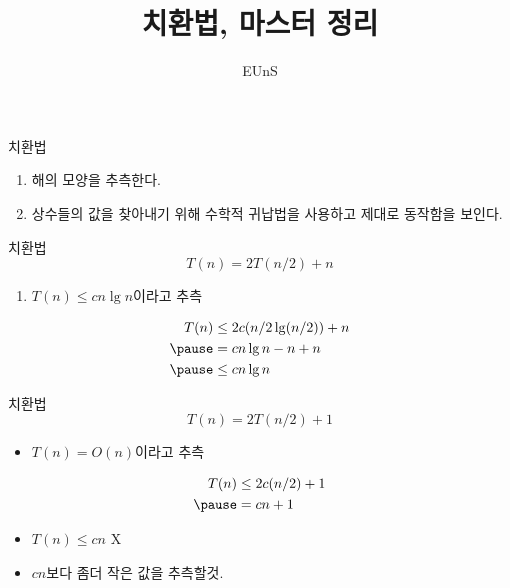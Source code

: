 \documentclass[10pt]{beamer}
\title{치환법, 마스터 정리}
\author{EUnS}
\begin{document}
\begin{frame}{}
    \maketitle
\end{frame}


\begin{frame}{치환법}
    \begin{enumerate}
        \item 해의 모양을 추측한다.
        \item 상수들의 값을 찾아내기 위해 수학적 귀납법을 사용하고 제대로 동작함을 보인다.
    \end{enumerate}
\end{frame}

\begin{frame}{치환법}
    $$T(n) = 2T(n/2) + n$$
    \begin{enumerate}
        \item $T(n) \le cn \lg n$이라고 추측
    \end{enumerate}
    \[
        \begin{aligned}
           T(n) &\le 2c(n/2\lg (n/2)) +n \\ \pause
            &= cn\lg n - n + n \\  \pause
            &\le cn\lg n
        \end{aligned}
    \]
\end{frame}


\begin{frame}{치환법}
    $$T(n) = 2T(n/2) + 1$$
    \begin{itemize}
        \item $T(n) = O(n)$이라고 추측
    \end{itemize}
    \[
        \begin{aligned}
           T(n) &\le 2c(n/2) +1 \\ \pause
            &= cn + 1
        \end{aligned}
    \]
    \begin{itemize}
        \item $T(n) \le cn $ X \pause
        \item $cn$보다 좀더 작은 값을 추측할것.
    \end{itemize}

\end{frame}
\end{document}
